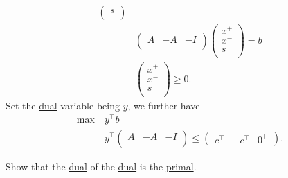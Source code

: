 \begin{answer}
\[\begin{aligned}
\begin{pmatrix}
				                     s   \\
			                     \end{pmatrix}    \\
			      & \begin{pmatrix}
				        A & -A & -I \\
			        \end{pmatrix}\begin{pmatrix}
				                     x^+ \\
				                     x^- \\
				                     s   \\
			                     \end{pmatrix} = b \\
			      & \begin{pmatrix}
				        x^+ \\
				        x^- \\
				        s   \\
			        \end{pmatrix}\geq 0.
		\end{aligned}
	\]
	Set the \hyperref[def:dual]{dual} variable being \(y\), we further have
	\[
		\begin{aligned}
			\max~ & y^{\top}b                                                   \\
			      & y^{\top} \begin{pmatrix}
				                 A & -A & -I \\
			                 \end{pmatrix} \leq \begin{pmatrix}
				                                    c^{\top} & -c^{\top} & 0^{\top}
			                                    \end{pmatrix}.
		\end{aligned}
	\]
\end{answer}

\begin{exercise}
	Show that the \hyperref[def:dual]{dual} of the \hyperref[def:dual]{dual} is the \hyperref[def:primal]{primal}.
\end{exercise}